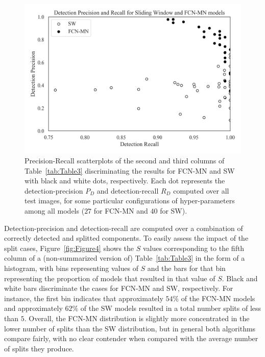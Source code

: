 \documentclass[a4paper,authoryear,review]{elsarticle}
\begin{document}
 \begin{figure}
    \centering
    \includegraphics[width=\textwidth]{figures/Figure3.png}
    \caption{
Precision-Recall scatterplots of the second and third columns of Table~\ref{tab:Table3} discriminating the results for FCN-MN and SW with black and white dots, respectively. Each dot represents the detection-precision $P_D$ and detection-recall $R_D$ computed over all test images, for some particular configurations of hyper-parameters among all models ($27$ for FCN-MN  and $40$ for SW).
    }
    \label{fig:Figure3}
\end{figure}


Detection-precision and detection-recall are computed over a combination of correctly detected and splitted components. To easily assess the impact of the split cases, Figure~\ref{fig:Figure4} shows the $S$ values corresponding to the fifth column of a   (non-summarized version of) Table~\ref{tab:Table3} in the form of a histogram, with bins representing values of $S$ and the bars for that bin representing the proportion of models that resulted in that value of $S$. Black and white bars discriminate the cases for FCN-MN and SW, respectively. For instance, the first bin indicates that approximately $54\%$ of the FCN-MN models and approximately $62\%$ of the SW models resulted in a total number splits of less than $5$. Overall, the FCN-MN distribution is slightly more concentrated in the lower number of splits than the SW distribution, but in general both algorithms compare fairly, with no clear contender when compared with the average number of splits they produce. 
\end{document}
